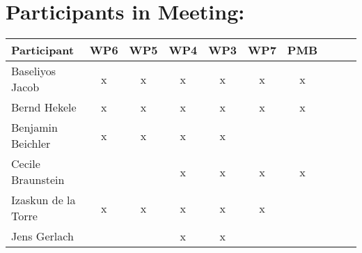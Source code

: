 \documentclass[a4paper, 11pt]{article}
\begin{document}
\section{Participants in Meeting:}

\begin{tabular}{|l|c|c|c||c|c|c||c|c|c|}
\hline
\textbf{Participant} & \textbf{WP6} &  \textbf{WP5} & \textbf{WP4}&  \textbf{WP3} & \textbf{WP7}&  \textbf{PMB} \\\hline
Baseliyos Jacob      & x & x & x & x & x & x \\\hline 
Bernd Hekele         & x & x & x & x & x & x \\\hline
Benjamin Beichler    & x & x & x & x &   &   \\\hline
Cecile Braunstein    &   &   & x & x & x & x \\\hline
Izaskun de la Torre  & x & x & x & x & x &   \\\hline
Jens Gerlach         &   &   & x & x &   &   \\\hline

\end{tabular}
\end{document}
